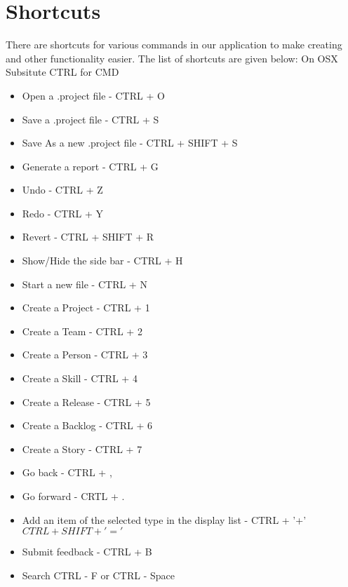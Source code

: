 \section{Shortcuts}

There are shortcuts for various commands in our application to make creating and other functionality easier. The list of shortcuts are given below:
On OSX Subsitute CTRL for CMD

\begin{itemize}
\item Open a .project file - CTRL + O
\item Save a .project file - CTRL + S
\item Save As a new .project file - CTRL + SHIFT + S
\item Generate a report - CTRL + G
\item Undo - CTRL + Z
\item Redo - CTRL + Y
\item Revert - CTRL + SHIFT + R
\item Show/Hide the side bar - CTRL + H
\item Start a new file - CTRL + N
\item Create a Project - CTRL + 1
\item Create a Team - CTRL + 2
\item Create a Person - CTRL + 3
\item Create a Skill - CTRL + 4
\item Create a Release - CTRL + 5
\item Create a Backlog - CTRL + 6
\item Create a Story - CTRL + 7
\item Go back - CTRL + ,
\item Go forward - CRTL + .
\item Add an item of the selected type in the display list - CTRL + '+' \(CTRL + SHIFT + '='\)
\item Submit feedback - CTRL + B
\item Search CTRL - F  or CTRL - Space
\end{itemize}
